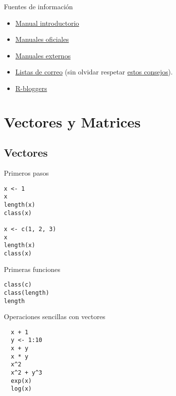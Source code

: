\documentclass[xcolor={usenames,svgnames,dvipsnames}]{beamer}
\begin{document}
\begin{frame}[label=sec-1-3-1]{Fuentes de información}
\begin{itemize}
\item \href{http://cran.r-project.org/doc/manuals/R-intro.html}{Manual introductorio}
\item \href{http://cran.r-project.org/manuals.html}{Manuales oficiales}
\item \href{http://cran.r-project.org/other-docs.html}{Manuales externos}
\item \href{http://www.r-project.org/mail.html}{Listas de correo} (sin olvidar respetar \href{http://www.r-project.org/posting-guide.html}{estos consejos}).
\item \href{http://www.r-bloggers.com}{R-bloggers}
\end{itemize}
\end{frame}


\section{Vectores y Matrices}
\label{sec-2}

\subsection{Vectores}
\label{sec-2-1}
\begin{frame}[fragile,label=sec-2-1-1]{Primeros pasos}
 \lstset{language=R,label= ,caption= ,numbers=none}
\begin{lstlisting}
x <- 1
x
length(x)
class(x)

x <- c(1, 2, 3)
x
length(x)
class(x)
\end{lstlisting}
\end{frame}

\begin{frame}[fragile,label=sec-2-1-2]{Primeras funciones}
 \lstset{language=R,label= ,caption= ,numbers=none}
\begin{lstlisting}
class(c)
class(length)
length
\end{lstlisting}
\end{frame}

\begin{frame}[fragile,label=sec-2-1-3]{Operaciones sencillas con vectores}
 \lstset{language=R,label= ,caption= ,numbers=none}
\begin{lstlisting}
  x + 1
  y <- 1:10
  x + y
  x * y
  x^2
  x^2 + y^3
  exp(x)
  log(x)
\end{lstlisting}
\end{frame}
\end{document}
